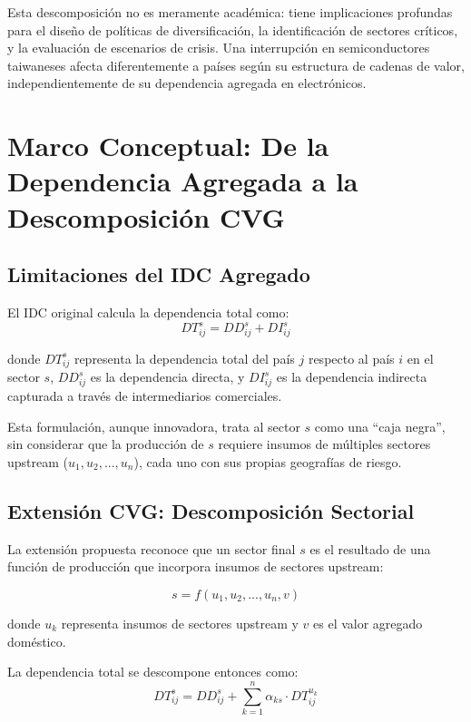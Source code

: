 \documentclass[12pt,a4paper]{article}
\begin{document}
Esta descomposición no es meramente académica: tiene implicaciones profundas para el diseño de políticas de diversificación, la identificación de sectores críticos, y la evaluación de escenarios de crisis. Una interrupción en semiconductores taiwaneses afecta diferentemente a países según su estructura de cadenas de valor, independientemente de su dependencia agregada en electrónicos.

\section{Marco Conceptual: De la Dependencia Agregada a la Descomposición CVG}

\subsection{Limitaciones del IDC Agregado}

El IDC original calcula la dependencia total como:
\begin{equation}
DT_{ij}^s = DD_{ij}^s + DI_{ij}^s
\end{equation}

donde $DT_{ij}^s$ representa la dependencia total del país $j$ respecto al país $i$ en el sector $s$, $DD_{ij}^s$ es la dependencia directa, y $DI_{ij}^s$ es la dependencia indirecta capturada a través de intermediarios comerciales.

Esta formulación, aunque innovadora, trata al sector $s$ como una ``caja negra'', sin considerar que la producción de $s$ requiere insumos de múltiples sectores upstream ($u_1, u_2, ..., u_n$), cada uno con sus propias geografías de riesgo.

\subsection{Extensión CVG: Descomposición Sectorial}

La extensión propuesta reconoce que un sector final $s$ es el resultado de una función de producción que incorpora insumos de sectores upstream:

\begin{equation}
s = f(u_1, u_2, ..., u_n, v)
\end{equation}

donde $u_k$ representa insumos de sectores upstream y $v$ es el valor agregado doméstico.

La dependencia total se descompone entonces como:
\begin{equation}
DT_{ij}^s = DD_{ij}^s + \sum_{k=1}^{n} \alpha_{ks} \cdot DT_{ij}^{u_k}
\end{equation}
\end{document}
